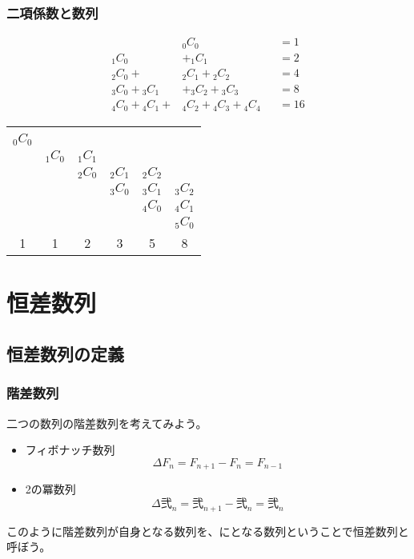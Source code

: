 \documentclass[dvipdfmx,12pt]{beamer}
\begin{document}
\begin{frame}
\frametitle{二項係数と数列}
\begin{multicols}{2}

\begin{alignat*}{2}
&{_0C_0}& &=1\\
{_1C_0}&+{_1C_1}& &=2\\
{_2C_0}+&{_2C_1}+{_2C_2}& &=4\\
{_3C_0}+{_3C_1}&+{_3C_2}+{_3C_3}& &=8\\
{_4C_0}+{_4C_1}+&{_4C_2}+{_4C_3}+{_4C_4}& &=16
\end{alignat*}


\begin{table}
\begin{tabular}{cccccc}
\quad&\multicolumn{5}{c}{}\\

${_0C_0}$&\multicolumn{5}{c}{}\\
&${_1C_0}$&${_1C_1}$&\multicolumn{3}{c}{}\\
&&${_2C_0}$&${_2C_1}$&${_2C_2}$&\\
&&&${_3C_0}$&${_3C_1}$&${_3C_2}$\\
&&&&${_4C_0}$&${_4C_1}$\\
&&&&&${_5C_0}$\\ \hline
1&1&2&3&5&8

\end{tabular}
\end{table}

\end{multicols}
\end{frame}

\section{恒差数列}
\subsection{恒差数列の定義}
\begin{frame}
\frametitle{階差数列}
二つの数列の階差数列を考えてみよう。
\begin{itemize}
\item{
フィボナッチ数列
$$
\Delta F_n=F_{n+1}-F_n=F_{n-1}
$$
}
\item{
2の冪数列
$$
\Delta \mbox{弐}_n=\mbox{弐}_{n+1}-\mbox{弐}_n=\mbox{弐}_n
$$
}
\end{itemize}
このように階差数列が自身となる数列を、にとなる数列ということで恒差数列と呼ぼう。
\end{frame}
\end{document}
